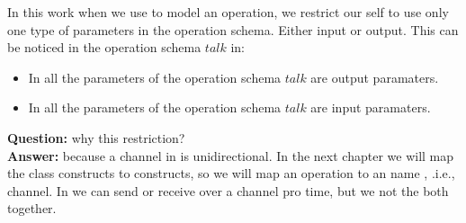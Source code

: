 In this work when we use \oz{} to model an operation, we restrict our self to use only one type of parameters in the operation schema. Either input or output. This can be noticed in the operation schema $talk$ in:
\begin{itemize}
\item In  all the parameters of the operation schema $talk$ are output paramaters.
\item In   all the parameters of the operation schema $talk$ are input paramaters.
\end{itemize}
\textbf{Question:} why this restriction?\\
\textbf{Answer:} because a channel in \picalc{} is unidirectional. In the next chapter we will map the \oz{} class constructs to  \picalc{} constructs, so we will map an \oz{} operation to an \picalc{} name , .i.e., channel. In \picalc{} we can send or receive over a channel pro time, but we not the both together.